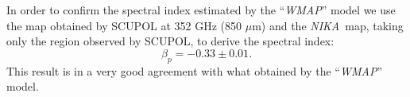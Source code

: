 \documentclass[twocolumn,traditabstract]{aa}
\def\NIKA{\textit{NIKA}}
\def\WMAP{\textit{WMAP}}
\begin{document}
In order to confirm the spectral index estimated by the ``\WMAP'' model we use the map obtained by SCUPOL at 352 GHz (850 $\mu$m) and the \NIKA\ map, taking only the region observed by SCUPOL, to derive the spectral index:
\begin{equation}
\beta_p = -0.33 \pm 0.01.
\end{equation}
This result is in a very good agreement with what obtained by the ``\WMAP'' model.



\end{document}
